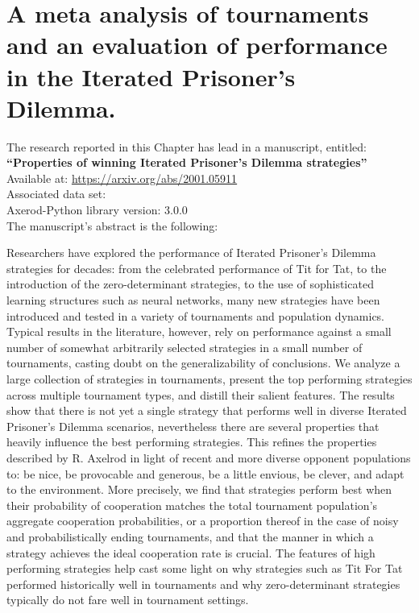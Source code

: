 \chapter{A meta analysis of tournaments and an evaluation of performance in the
Iterated Prisoner's Dilemma.}\label{chapter:meta_tournaments}

\begin{center}
    The research reported in this Chapter has lead in a manuscript, entitled: \\
    \textbf{``Properties of winning Iterated Prisoner's Dilemma strategies''} \\
    Available at: \url{https://arxiv.org/abs/2001.05911} \\
    Associated data set: \cite{Glynatsi_2019_metatournament} \\ %
    Axerod-Python library version: 3.0.0 \\ \vspace{.5cm}
    The manuscript's abstract is the following:
\end{center}

Researchers have explored the performance of Iterated Prisoner's Dilemma strategies
for decades: from the celebrated performance of Tit for Tat, to the
introduction of the zero-determinant strategies, to the use of sophisticated learning
structures such as neural networks, many new strategies have been introduced and tested
in a variety of tournaments and population dynamics. Typical results in the literature,
however, rely on performance against a small number of somewhat arbitrarily selected
strategies in a small number of tournaments, casting doubt on the generalizability
of conclusions. We analyze a large collection of \numberofstrategies
strategies in \numberofalltournaments tournaments, present the top performing strategies across multiple
tournament types, and distill their salient features.
The results show that there is not yet a single
strategy that performs well in diverse Iterated Prisoner's Dilemma scenarios,
nevertheless there are several properties that heavily influence the best performing
strategies. This refines the properties described by R. Axelrod in light of
recent and more diverse opponent populations to: be nice, be provocable and generous,
be a little envious, be clever, and adapt to the environment. More precisely,
we find that strategies perform best when their probability of cooperation
matches the total tournament population's aggregate cooperation probabilities,
or a proportion thereof in the case of noisy and probabilistically ending tournaments,
and that the manner in which a strategy achieves the ideal cooperation rate is crucial.
The features of high performing strategies help cast some light on why strategies such as Tit For Tat
performed historically well in tournaments and why zero-determinant strategies
typically do not fare well in tournament settings.

